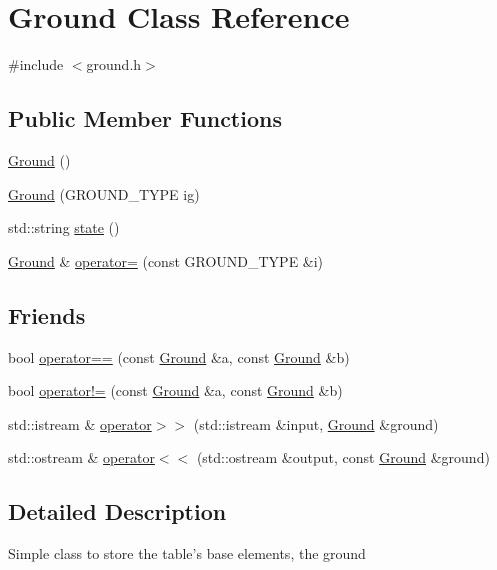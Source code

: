 \hypertarget{class_ground}{\section{Ground Class Reference}
\label{class_ground}
}


{\ttfamily \#include $<$ground.\-h$>$}

\subsection*{Public Member Functions}
\begin{DoxyCompactItemize}
\item 
\hyperlink{class_ground_abe733811bf44d4791c7811a5f71aae25}{Ground} ()
\item 
\hyperlink{class_ground_a5b412328f85377cb7acb148c8bd17503}{Ground} (G\-R\-O\-U\-N\-D\-\_\-\-T\-Y\-P\-E ig)
\item 
std\-::string \hyperlink{class_ground_a13612424670c56153362964ba9e4a9eb}{state} ()
\item 
\hyperlink{class_ground}{Ground} \& \hyperlink{class_ground_ac75d031789e230c1de3d6214915c9ea7}{operator=} (const G\-R\-O\-U\-N\-D\-\_\-\-T\-Y\-P\-E \&i)
\end{DoxyCompactItemize}
\subsection*{Friends}
\begin{DoxyCompactItemize}
\item 
bool \hyperlink{class_ground_ae2c7493e64936e5bf87e052332fc1dd9}{operator==} (const \hyperlink{class_ground}{Ground} \&a, const \hyperlink{class_ground}{Ground} \&b)
\item 
bool \hyperlink{class_ground_abbbae09754b723088573ad44302267a2}{operator!=} (const \hyperlink{class_ground}{Ground} \&a, const \hyperlink{class_ground}{Ground} \&b)
\item 
std\-::istream \& \hyperlink{class_ground_afb5cf7ce36df46e353f2944ed7e6cecc}{operator$>$$>$} (std\-::istream \&input, \hyperlink{class_ground}{Ground} \&ground)
\item 
std\-::ostream \& \hyperlink{class_ground_aa2bb03fd66292501e3132454a8d0d23a}{operator$<$$<$} (std\-::ostream \&output, const \hyperlink{class_ground}{Ground} \&ground)
\end{DoxyCompactItemize}


\subsection{Detailed Description}
Simple class to store the table's base elements, the ground 

